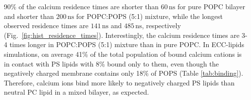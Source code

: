 \documentclass[journal=jpcbfk,manuscript=article]{achemso}
\begin{document}
90\% of the calcium residence times are shorter than $60\,\mathrm{ns}$ for pure POPC bilayer
and shorter than $200\,\mathrm{ns}$ for POPC:POPS (5:1) mixture, while the
longest observed residence times are $141\,\mathrm{ns}$ and $485\,\mathrm{ns}$, respectively (Fig.~\ref{fig:hist_residence_times}).
Interestingly, the calcium residence times are 3-4 times longer in POPC:POPS (5:1) mixture than in pure POPC.
In ECC-lipids simulations, on average 41\% of the total population of bound calcium cations is in contact with PS lipids
with 8\% bound only to them, even though the negatively charged membrane contains only 18\% of POPS (Table \ref{tab:binding}).
Therefore, calcium ions bind more likely to negatively charged PS lipids than neutral PC lipid in a mixed bilayer, as expected.


\end{document}
